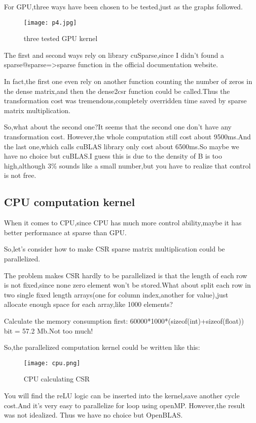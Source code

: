\documentclass[12pt]{scrartcl} %
\begin{document}
For GPU,three ways have been chosen to be tested,just as the graphs followed.
\begin{figure}[H]
    \centering
    \texttt{[image: p4.jpg]}
    \label{}
    \caption{three tested GPU kernel}
\end{figure}
The first and second ways rely on library cuSparse,since I didn't found a sparse@sparse=>sparse function in the official documentation website.

In fact,the first one even rely on another function counting the number of zeros in the dense matrix,and then the dense2csr function could be called.Thus the transformation cost was tremendous,completely overridden time saved by sparse matrix multiplication.

So,what about the second one?It seems that the second one don't have any transformation cost. However,the whole computation still cost about 9500ms.And the last one,which calls cuBLAS library only cost about 6500ms.So maybe we have no choice but cuBLAS.I guess this is due to the density of B is too high,although 3\% sounds like a small number,but you have to realize that control is not free.
\subsection{CPU computation kernel}
When it comes to CPU,since CPU has much more control ability,maybe it has better performance at sparse than GPU.

So,let's consider how to make CSR sparse matrix multiplication could be parallelized.

The problem makes CSR hardly to be parallelized is that the length of each row is not fixed,since none zero element won't be stored.What about split each row in two single fixed length arrays(one for column index,another for value),just allocate enough space for each array,like 1000 elements?

Calculate the memory consumption first: 60000*1000*(sizeof(int)+sizeof(float)) bit = 57.2 Mb.Not too much!

So,the parallelized computation kernel could be written like this:
\begin{figure}[H]
    \centering
    \texttt{[image: cpu.png]}
    \caption{CPU calculating CSR}
    \label{}
\end{figure}

You will find the reLU logic can be inserted into the kernel,save another cycle cost.And it's very easy to parallelize for loop using openMP. However,the result was not idealized. Thus we have no choice but OpenBLAS.
\end{document}
